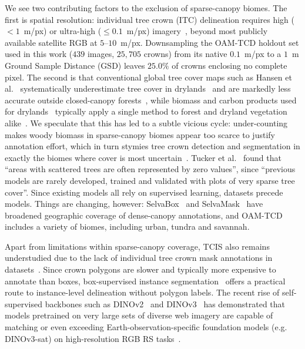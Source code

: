 \documentclass[remotesensing,article,submit,moreauthors]{Definitions/mdpi}
\begin{document}
We see two contributing factors to the exclusion of sparse-canopy biomes. The first is spatial resolution: individual tree crown (ITC) delineation requires high ($<1$~m/px) or ultra-high ($\leq 0.1$~m/px) imagery~\cite{oamtcd}, beyond most publicly available satellite RGB at $5$--$10$~m/px. Downsampling the OAM-TCD holdout set used in this work ($439$ images, $25{,}705$ crowns) from its native $0.1$~m/px to a $1$~m Ground Sample Distance (GSD) leaves $25.0\%$ of crowns enclosing no complete pixel. The second is that conventional global tree cover maps such as Hansen et al.~\cite{hansen2013} systematically underestimate tree cover in drylands~\cite{fagan2020} and are markedly less accurate outside closed-canopy forests~\cite{brandtstolle2021}, while biomass and carbon products used for drylands~\cite{baccini2012,avitabile2016,bouvet2018} typically apply a single method to forest and dryland vegetation alike~\cite{tucker2023}. We speculate that this has led to a subtle vicious cycle: under-counting makes woody biomass in sparse-canopy biomes appear too scarce to justify annotation effort, which in turn stymies tree crown detection and segmentation in exactly the biomes where cover is most uncertain~\cite{bastin2017}. Tucker et al.~\cite{tucker2023} found that ``areas with scattered trees are often represented by zero values'', since ``previous models are rarely developed, trained and validated with plots of very sparse tree cover''. Since existing models all rely on supervised learning, datasets precede models. Things are changing, however: SelvaBox~\cite{selvabox} and SelvaMask~\cite{selvamask} have broadened geographic coverage of dense-canopy annotations, and OAM-TCD~\cite{oamtcd} includes a variety of biomes, including urban, tundra and savannah.



Apart from limitations within sparse-canopy coverage, TCIS also remains understudied due to the lack of individual tree crown mask annotations in datasets~\cite{teng2025}. Since crown polygons are slower and typically more expensive to annotate than boxes, box-supervised instance segmentation~\cite{boxinst,box2mask,boxteacher} offers a practical route to instance-level delineation without polygon labels. The recent rise of self-supervised backbones such as DINOv2~\cite{dinov2} and DINOv3~\cite{dinov3} has demonstrated that models pretrained on very large sets of diverse web imagery are capable of matching or even exceeding Earth-observation-specific foundation models (e.g. DINOv3-sat) on high-resolution RGB RS tasks~\cite{dinov3}. 
\end{document}
